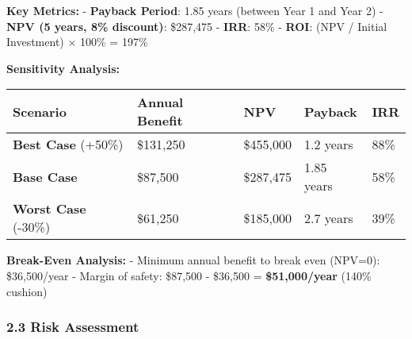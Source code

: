 \documentclass[
]{article}
\begin{document}
\textbf{Key Metrics:} - \textbf{Payback Period}: 1.85 years (between
Year 1 and Year 2) - \textbf{NPV (5 years, 8\% discount)}: \$287,475 -
\textbf{IRR}: 58\% - \textbf{ROI}: (NPV / Initial Investment) × 100\% =
197\%

\textbf{Sensitivity Analysis:}

\begin{longtable}[]{@{}lllll@{}}
\toprule\noalign{}
\textbf{Scenario} & \textbf{Annual Benefit} & \textbf{NPV} &
\textbf{Payback} & \textbf{IRR} \\
\midrule\noalign{}
\endhead
\bottomrule\noalign{}
\endlastfoot
\textbf{Best Case} (+50\%) & \$131,250 & \$455,000 & 1.2 years & 88\% \\
\textbf{Base Case} & \$87,500 & \$287,475 & 1.85 years & 58\% \\
\textbf{Worst Case} (-30\%) & \$61,250 & \$185,000 & 2.7 years & 39\% \\
\end{longtable}

\textbf{Break-Even Analysis:} - Minimum annual benefit to break even
(NPV=0): \$36,500/year - Margin of safety: \$87,500 - \$36,500 =
\textbf{\$51,000/year} (140\% cushion)

\hypertarget{risk-assessment}{%
\subsubsection{2.3 Risk Assessment}\label{risk-assessment}}
\end{document}
